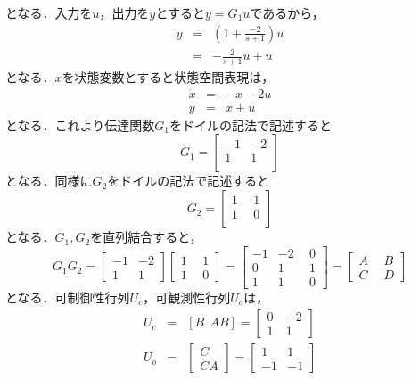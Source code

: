 \documentclass[a4paper,12pt]{jarticle}
\begin{document}
%
となる．入力を$u$，出力を$y$とすると$y=G_1u$であるから，
%
\begin{eqnarray}
 y&=&\left(1+\frac{-2}{s+1}\right)u \nonumber\\
  &=&-\frac{2}{s+1}u+u
\end{eqnarray}
%
となる．$x$を状態変数とすると状態空間表現は，
%
\begin{eqnarray}
 \dot{x}&=&-x-2u\\
 y&=&x+u
\end{eqnarray}
%
となる．これより伝達関数$G_1$をドイルの記法で記述すると
%
\begin{equation}
 G_1=\left[
  \begin{array}{c|c}
  -1 & -2  \\ \hline
   1 & 1   \\ 
  \end{array}
  \right]
\end{equation}
%
となる．同様に$G_2$をドイルの記法で記述すると
%
\begin{equation}
 G_2=\left[
  \begin{array}{c|c}
  1 ~&~ 1  \\ \hline
  1 ~&~ 0   \\ 
  \end{array}
  \right]
\end{equation}
%
となる．$G_1,G_2$を直列結合すると，
%
\begin{equation}
 G_1G_2=\left[
  \begin{array}{c|c}
  -1 & -2  \\ \hline
   1 & 1    
  \end{array}
  \right] \left[
  \begin{array}{c|c}
  1 ~&~ 1  \\ \hline
  1 ~&~ 0    
  \end{array}
  \right]=\left[
  \begin{array}{cc|c}
  -1 & -2 ~&~ 0  \\ 
  0  &  1 ~&~ 1  \\\hline
  1  &  1 ~&~ 0
  \end{array}
  \right]=\left[
  \begin{array}{c|c}
  A ~&~ B  \\ \hline
  C ~&~ D    
  \end{array}
  \right]
  \end{equation}
%
となる．可制御性行列$U_c$，可観測性行列$U_o$は，
%
\begin{eqnarray}
 U_c&=&[B~~AB]=\left[
  \begin{array}{cc}
  0 ~& -2  \\ 
  1 ~& 1    
  \end{array}
\right] \\
 U_o&=&\left[
  \begin{array}{c}
  C \\ 
  CA     
  \end{array}
\right]=\left[
  \begin{array}{cc}
  1  & 1  \\ 
  -1 & -1    
  \end{array}
\right] 
\end{eqnarray}
\end{document}
